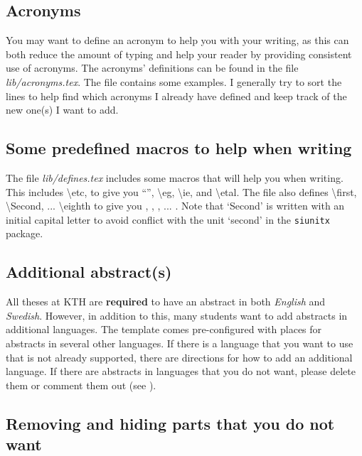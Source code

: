 \documentclass[examplethesis.tex]{subfiles}
\begin{document}
\subsection{Acronyms}
\label{sec:addingAcronyms}
You may want to define an acronym to help you with your writing, as this can both reduce the amount of typing and help your reader by providing consistent use of acronyms. The acronyms' definitions can be found in the file \textit{lib/acronyms.tex}. The file contains some examples. I generally try to sort the lines to help find which acronyms I already have defined and keep track of the new one(s) I want to add.

\subsection{Some predefined macros to help when writing}
\label{sec:predefine}

The file \textit{lib/defines.tex} includes some macros that will help you when writing. This includes \textbackslash etc, to give you ``\etc'', \textbackslash eg, \textbackslash ie, and \textbackslash etal.
The file also defines \textbackslash first, \textbackslash Second, ... \textbackslash eighth to give you \first, \Second, \third, ... \eighth. Note that `Second' is written with an initial capital letter to avoid conflict with the unit `second' in the \texttt{siunitx} package.

\subsection{Additional abstract(s)}
\label{sec:additionalAbstracts}

All theses at KTH are \textbf{required} to have an abstract in both \textit{English} and \textit{Swedish}. However, in addition to this, many students want to add abstracts in additional languages. The template comes pre-configured with places for abstracts in several other languages. If there is a language that you want to use that is not already supported, there are directions for how to add an additional language. If there are abstracts in languages that you do not want, please delete them or comment them out (see ).

\subsection{Removing and hiding parts that you do not want}
\label{sec:hideComment}
\end{document}
